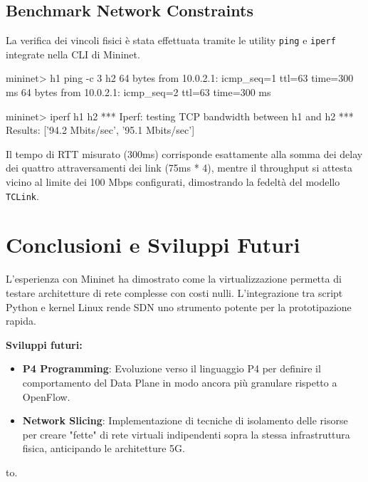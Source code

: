 \documentclass[a4paper,12pt]{article}
\begin{document}
\subsection{Benchmark Network Constraints}
La verifica dei vincoli fisici è stata effettuata tramite le utility \texttt{ping} e \texttt{iperf} integrate nella CLI di Mininet.
\begin{terminal}
mininet> h1 ping -c 3 h2
64 bytes from 10.0.2.1: icmp_seq=1 ttl=63 time=300 ms
64 bytes from 10.0.2.1: icmp_seq=2 ttl=63 time=300 ms

mininet> iperf h1 h2
*** Iperf: testing TCP bandwidth between h1 and h2 
*** Results: ['94.2 Mbits/sec', '95.1 Mbits/sec']
\end{terminal}
Il tempo di RTT misurato (300ms) corrisponde esattamente alla somma dei delay dei quattro attraversamenti dei link (75ms * 4), mentre il throughput si attesta vicino al limite dei 100 Mbps configurati, dimostrando la fedeltà del modello \texttt{TCLink}.

\section{Conclusioni e Sviluppi Futuri}
L'esperienza con Mininet ha dimostrato come la virtualizzazione permetta di testare architetture di rete complesse con costi nulli. L'integrazione tra script Python e kernel Linux rende SDN uno strumento potente per la prototipazione rapida.

\noindent \textbf{Sviluppi futuri:}
\begin{itemize}
    \item \textbf{P4 Programming}: Evoluzione verso il linguaggio P4 per definire il comportamento del Data Plane in modo ancora più granulare rispetto a OpenFlow.
    \item \textbf{Network Slicing}: Implementazione di tecniche di isolamento delle risorse per creare "fette" di rete virtuali indipendenti sopra la stessa infrastruttura fisica, anticipando le architetture 5G.
\end{itemize}
to.
\end{document}
